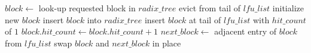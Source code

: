 \begin{algorithmic}
  \State $block \gets$ look-up requested block in $radix\_tree$
      \State evict from tail of $lfu\_list$
    \EndIf
    \State initialize new $block$
    \State insert $block$ into $radix\_tree$
    \State insert $block$ at tail of $lfu\_list$ with $hit\_count$ of $1$
  \Else
    \State $block.hit\_count \gets block.hit\_count + 1$
    \State $next\_block \gets$ adjacent entry of $block$ from $lfu\_list$
      \State swap $block$ and $next\_block$ in place
    \EndIf
  \EndIf
\end{algorithmic}
